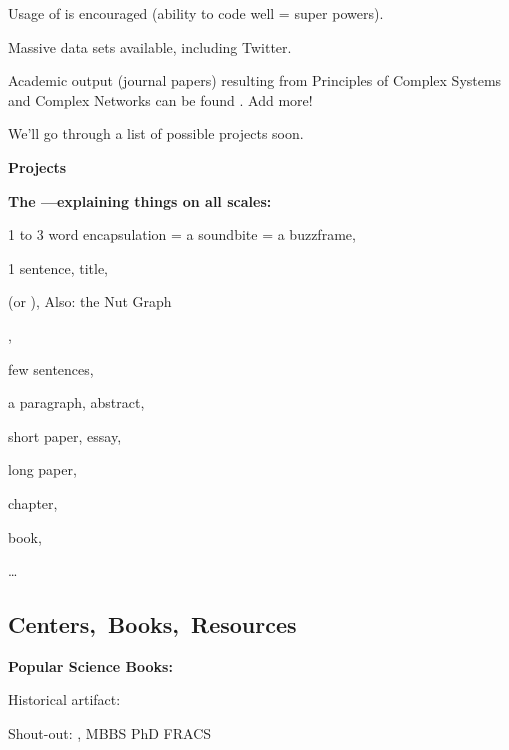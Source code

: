     Usage of 
    is encouraged (ability to code well = super powers).
  
    Massive data sets available, including Twitter.
  
    Academic output (journal papers) resulting from Principles
    of Complex Systems and Complex Networks can be found
    .  Add more!
  
    We'll go through a list of possible projects soon.
  
  


  \textbf{Projects}

  \textbf{The ---explaining things on all scales:}
    
     
      1 to 3 word encapsulation = a soundbite = a buzzframe,
     
      1 sentence, title,


       (or
      ),
      Also: the Nut Graph
     
      ,
     

      few sentences,
     
      a paragraph, abstract,
     
      short paper, essay,
     
      long paper,
     
      chapter,
     
      book,
     
      \ldots
    
  



\subsection{Centers,\ Books,\ Resources}

  \textbf{Popular Science Books:}

  Historical artifact:
  \bigskip
  \bigskip
  
      
    
          
      Shout-out:
      , \newline
      MBBS PhD FRACS 
      
